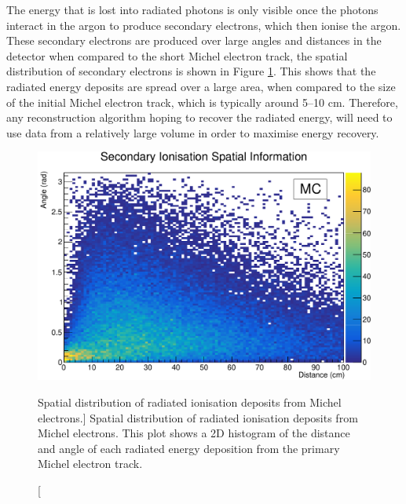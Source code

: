 The energy that is lost into radiated photons is only visible once the photons
interact in the argon to produce secondary electrons, which then ionise the
argon. These secondary electrons are produced over large angles and distances
in the detector when compared to the short Michel electron track, the spatial
distribution of secondary electrons is shown in Figure \ref{fig:photon_geom}.
This shows that the radiated energy deposits are spread over a large area, when
compared to the size of the initial Michel electron track, which is typically
around 5--10 cm. Therefore, any reconstruction algorithm hoping to recover the 
radiated energy, will need to use data from a relatively large volume in order 
to maximise energy recovery.
\begin{figure}
	\centering
	\includegraphics[width=\textwidth]{figures/photon_geom.pdf}
	\caption
	[Spatial distribution of radiated ionisation deposits from Michel electrons.]
	{Spatial distribution of radiated ionisation deposits from Michel electrons.
	This plot shows a 2D histogram of the distance and angle of each radiated
	energy deposition from the primary Michel electron track.}
	\label{fig:photon_geom}
\end{figure}

